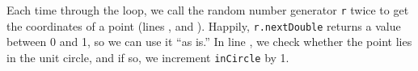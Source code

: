 \begin{description}

Each time through the loop, we call the random number generator
{\tt r} twice to get the coordinates of a point
(lines  , and  ).
Happily, {\tt r.next\-Double}
returns a value between 0 and 1, so we can use it ``as is.''   In line ,
we check whether the point lies in the unit circle, and if so, we increment
{\tt inCircle} by 1. 


\end{description}
